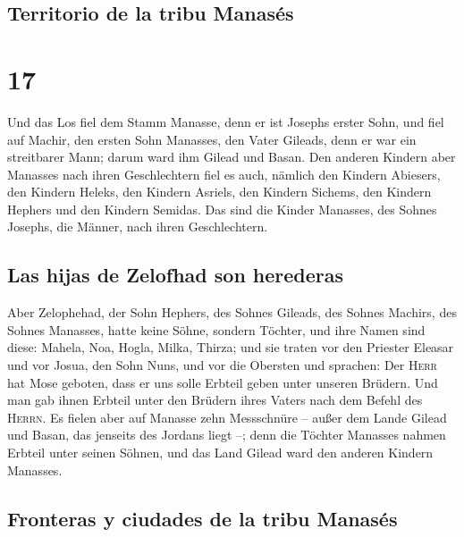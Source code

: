 \hypertarget{territorio-de-la-tribu-manasuxe9s}{%
\subsection{Territorio de la tribu
Manasés}\label{territorio-de-la-tribu-manasuxe9s}}

\hypertarget{section-16}{%
\section{17}\label{section-16}}

 Und das Los fiel dem Stamm Manasse, denn er ist Josephs
erster Sohn, und fiel auf Machir, den ersten Sohn Manasses, den Vater
Gileads, denn er war ein streitbarer Mann; darum ward ihm Gilead und
Basan.  Den anderen Kindern aber Manasses nach ihren
Geschlechtern fiel es auch, nämlich den Kindern Abiesers, den Kindern
Heleks, den Kindern Asriels, den Kindern Sichems, den Kindern Hephers
und den Kindern Semidas. Das sind die Kinder Manasses, des Sohnes
Josephs, die Männer, nach ihren Geschlechtern.

\hypertarget{las-hijas-de-zelofhad-son-herederas}{%
\subsection{Las hijas de Zelofhad son
herederas}\label{las-hijas-de-zelofhad-son-herederas}}

 Aber Zelophehad, der Sohn Hephers, des Sohnes Gileads,
des Sohnes Machirs, des Sohnes Manasses, hatte keine Söhne, sondern
Töchter, und ihre Namen sind diese: Mahela, Noa, Hogla, Milka, Thirza;
 und sie traten vor den Priester Eleasar und vor Josua,
den Sohn Nuns, und vor die Obersten und sprachen: Der \textsc{Herr} hat
Mose geboten, dass er uns solle Erbteil geben unter unseren Brüdern. Und
man gab ihnen Erbteil unter den Brüdern ihres Vaters nach dem Befehl des
\textsc{Herrn}.  Es fielen aber auf Manasse zehn
Messschnüre -- außer dem Lande Gilead und Basan, das jenseits des
Jordans liegt --;  denn die Töchter Manasses nahmen
Erbteil unter seinen Söhnen, und das Land Gilead ward den anderen
Kindern Manasses.

\hypertarget{fronteras-y-ciudades-de-la-tribu-manasuxe9s}{%
\subsection{Fronteras y ciudades de la tribu
Manasés}\label{fronteras-y-ciudades-de-la-tribu-manasuxe9s}}

